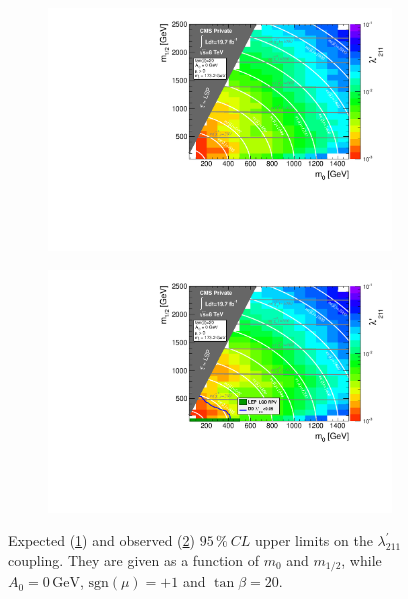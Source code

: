 \begin{figure}[!htbp]
  \centering
  \begin{subfigure}[b]{0.85\textwidth}
    \centering
    \includegraphics[width=\textwidth]{plots/l211limits_MultiBin_expected_logz-colz.pdf}
    \caption{\label{fig:lambda-prime-exp}}
  \end{subfigure}
  \begin{subfigure}[b]{0.85\textwidth}
    \centering
    \includegraphics[width=\textwidth]{plots/l211limits_MultiBin_logz-colz.pdf}
    \caption{\label{fig:lambda-prime-obs}}
  \end{subfigure}
  \caption{Expected (\ref{fig:lambda-prime-exp}) and observed (\ref{fig:lambda-prime-obs}) $95\,\%\: CL$ upper limits on the $\lambda^{\prime}_{211}$ coupling. They are given as a function of $m_0$ and $m_{1/2}$, while $A_0 = 0\,\text{GeV}$, $\text{sgn}(\mu) = +1$ and $\tan{\beta} = 20$.}
  \label{fig:lambda-prime-limits}
\end{figure}

